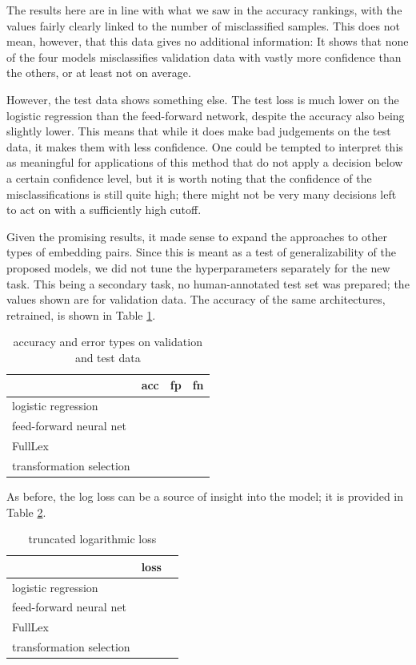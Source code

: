 \documentclass[a4paper, 12pt]{scrartcl}
\begin{document}
The results here are in line with what we saw in the accuracy rankings, with the values fairly clearly linked to the number of misclassified samples. This does not mean, however, that this data gives no additional information: It shows that none of the four models misclassifies validation data with vastly more confidence than the others, or at least not on average.

However, the test data shows something else. The test loss is much lower on the logistic regression than the feed-forward network, despite the accuracy also being slightly lower. This means that while it does make bad judgements on the test data, it makes them with less confidence. One could be tempted to interpret this as meaningful for applications of this method that do not apply a decision below a certain confidence level, but it is worth noting that the confidence of the misclassifications is still quite high; there might not be very many decisions left to act on with a sufficiently high cutoff.

Given the promising results, it made sense to expand the approaches to other types of embedding pairs. Since this is meant as a test of generalizability of the proposed models, we did not tune the hyperparameters separately for the new task. This being a secondary task, no human-annotated test set was prepared; the values shown are for validation data. The accuracy of the same architectures, retrained, is shown in Table \ref{accuracy-vn}.

\begin{table}[]
	\centering
	\begin{tabular}{l|lll}
		                         & acc      & fp       & fn        \\ \hline
		logistic regression      &          &          &           \\
		feed-forward neural net  &          &          &           \\
		FullLex                  &          &          &           \\
		transformation selection &          &          &
	\end{tabular}
	\caption{accuracy and error types on validation and test data}
	\label{accuracy-vn}
\end{table}

As before, the log loss can be a source of insight into the model; it is provided in Table \ref{loss-vn}.

\begin{table}[]
	\centering
	\begin{tabular}{l|l|l}
		                         & loss      \\ \hline
		logistic regression      &           \\
		feed-forward neural net  &           \\
		FullLex                  &           \\
		transformation selection &
	\end{tabular}
	\caption{truncated logarithmic loss}
	\label{loss-vn}
\end{table}
\end{document}
